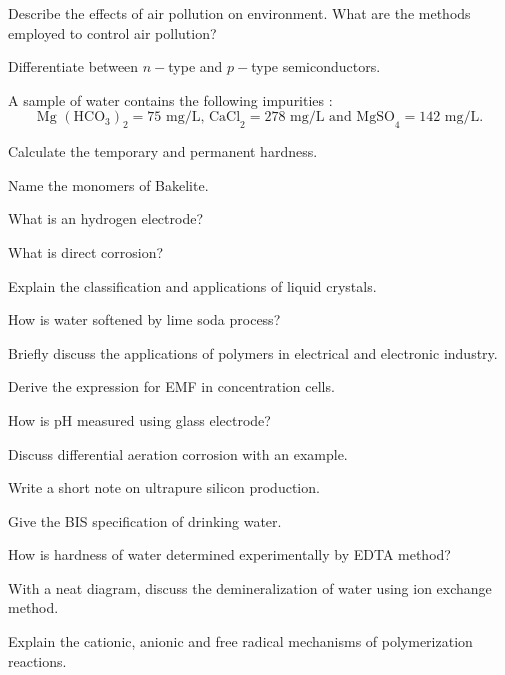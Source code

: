 \ene
\Or
\item Describe the effects of air pollution on environment. What are the methods employed
  to control air pollution?
\ene

\markC
\ene

\newpage

\sub{\subj}
\maxtime

\partA

\iitem Differentiate between $n-$type and $p-$type semiconductors.
\item A sample of water contains the following impurities :
  \[ \text{Mg }\left(\text{HCO}_3\right)_2 = 75 \text{ mg/L, CaCl}_2 =
  278\text{ mg/L and MgSO}_4 = \text{142 mg/L.}\]

  Calculate the temporary and permanent hardness.
\item Name the monomers of Bakelite.
\item What is an hydrogen electrode?
\item What is direct corrosion?

\markA
\partB

\item Explain the classification and applications of liquid crystals.
\item How is water softened by lime soda process?
\item Briefly discuss the applications of polymers in electrical and electronic industry.
\item Derive the expression for EMF in concentration cells.
\item How is pH measured using glass electrode?
\item Discuss differential aeration corrosion with an example.

\markB

\newpage \again

\partCo

\item
  \iitem 
    \iitem Write a short note on ultrapure silicon production.
    \item Give the BIS specification of drinking water.
\ene
\Or
\item How is hardness of water determined experimentally by EDTA method?
\ene


\item
\iitem With a neat diagram, discuss the demineralization of water using ion exchange method.
\Or
\item Explain the cationic, anionic and free radical mechanisms of polymerization reactions.
\ene

